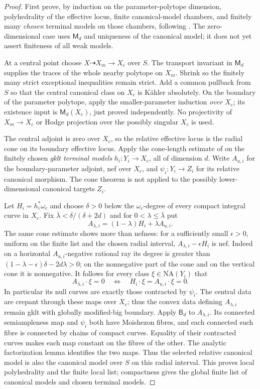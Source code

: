 \begin{proof}
First prove, by induction on the parameter-polytope dimension,
polyhedrality of the effective locus, finite canonical-model chambers,
and finitely many \emph{chosen} terminal models on those chambers,
following \cite[Theorem~5.15]{HX}.
The zero-dimensional case uses $\mathsf M_d$ and uniqueness of the
canonical model; it does not yet assert finiteness of all weak models.

At a central point choose $X\dashrightarrow X_m\to X_c$ over
$S$. The transport invariant in $\mathsf M_d$ supplies the traces
of the whole nearby polytope on $X_m$. Shrink so the finitely many
strict exceptional inequalities remain strict. Add a common pullback
from $S$ so that the central canonical class on $X_c$ is K\"ahler
absolutely. On the boundary of the parameter polytope, apply the
smaller-parameter induction \emph{over $X_c$}; its existence input
is $\mathsf M_d(X_c)$, just proved independently. No projectivity of
$X_m\to X_c$ or Hodge projection over the possibly singular $X_c$
is used.

The central adjoint is zero over $X_c$, so the relative effective
locus is the radial cone on its boundary effective locus. Apply the
cone-length estimate of \cite[Claim~5.1]{HX} on the finitely chosen
\emph{gklt terminal models} $h_i:Y_i\to X_c$, all of dimension $d$.
Write $A_{u,i}$ for the boundary-parameter adjoint, nef over $X_c$,
and $\psi_i:Y_i\to Z_i$ for its relative canonical morphism.
The cone theorem is not applied to the possibly lower-dimensional
canonical targets $Z_i$.

Let $H_i=h_i^*\omega_c$ and choose $\delta>0$ below the
$\omega_c$-degree of every compact integral curve in $X_c$. Fix $\bar\lambda<\delta/(\delta+2d)$ and for
$0<\lambda\leq\bar\lambda$ put
\[
 A_{\lambda,i}=(1-\lambda)H_i+\lambda A_{u,i}.
\]
The same cone estimate shows more than nefness: for a sufficiently
small $\epsilon>0$, uniform on the finite list and the chosen radial
interval, $A_{\lambda,i}-\epsilon H_i$ is nef. Indeed on a
horizontal $A_{u,i}$-negative rational ray its degree is greater than
$(1-\lambda-\epsilon)\delta-2d\lambda>0$; on the nonnegative
part of the cone and on the vertical cone it is nonnegative.
It follows for every class $\xi\in\overline{\mathrm{NA}}(Y_i)$ that
\[
 A_{\lambda,i}\cdot\xi=0
 \quad\Longleftrightarrow\quad
 H_i\cdot\xi=A_{u,i}\cdot\xi=0.
\]
In particular its null curves are exactly those contracted by
$\psi_i$. The central data are crepant through these maps over $X_c$;
thus the convex data defining $A_{\lambda,i}$ remain gklt with
globally modified-big boundary. Apply $\mathsf B_d$ to $A_{\lambda,i}$. Its connected
semiampleness map and $\psi_i$ both have Moishezon fibres, and each
connected such fibre is connected by chains of compact curves.
Equality of their contracted curves makes each map constant on the
fibres of the other. The analytic factorization lemma identifies
the two maps. Thus the selected relative canonical model is also
the canonical model over $S$ on this radial interval.
This proves local polyhedrality and the finite local list; compactness
gives the global finite list of canonical models and chosen terminal
models.


\end{proof}
